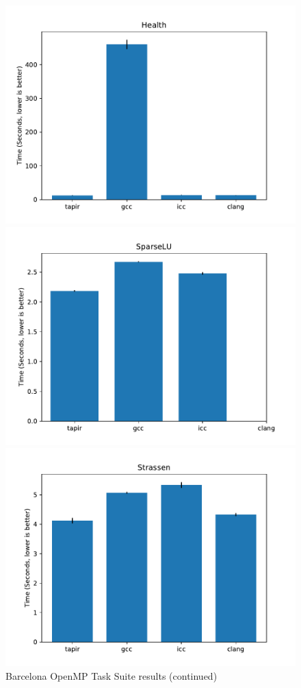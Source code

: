 \documentclass[sigconf]{acmart}
\begin{document}
\begin{figure}
\begin{multicols}{2}
  \includegraphics[width=\linewidth]{health.pdf} \par
  \includegraphics[width=\linewidth]{sparselu.pdf}
\end{multicols}
\centering
\includegraphics[width=0.45\linewidth]{strassen.pdf}
\caption{Barcelona OpenMP Task Suite results (continued)}
\label{fig:results2}
\end{figure}
\end{document}
